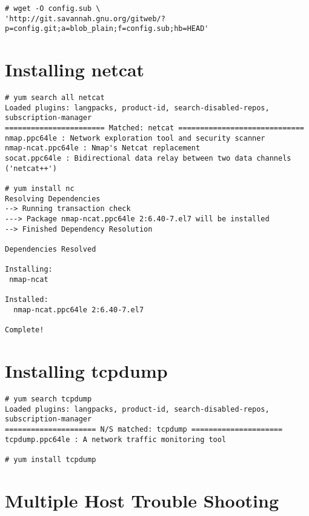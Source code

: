 \documentclass[letter]{article}
\begin{document}
{{\begin{appendices}
{\begin{lstlisting}
# wget -O config.sub \
'http://git.savannah.gnu.org/gitweb/?p=config.git;a=blob_plain;f=config.sub;hb=HEAD' 
\end{lstlisting}

\section{Installing netcat}
\label{appendix:nc}

\begin{lstlisting}
# yum search all netcat
Loaded plugins: langpacks, product-id, search-disabled-repos, subscription-manager
======================= Matched: netcat =============================
nmap.ppc64le : Network exploration tool and security scanner
nmap-ncat.ppc64le : Nmap's Netcat replacement
socat.ppc64le : Bidirectional data relay between two data channels ('netcat++')

# yum install nc
Resolving Dependencies
--> Running transaction check
---> Package nmap-ncat.ppc64le 2:6.40-7.el7 will be installed
--> Finished Dependency Resolution

Dependencies Resolved

Installing:
 nmap-ncat

Installed:
  nmap-ncat.ppc64le 2:6.40-7.el7                                                                                                                                                                                                             

Complete!

\end{lstlisting}


\section{Installing tcpdump}
\label{appendix:tcpdump}

\begin{lstlisting}
# yum search tcpdump
Loaded plugins: langpacks, product-id, search-disabled-repos, subscription-manager
===================== N/S matched: tcpdump =====================
tcpdump.ppc64le : A network traffic monitoring tool

# yum install tcpdump
\end{lstlisting}


}%

\section{Multiple Host Trouble Shooting}
\label{appendix:multihost}


\end{appendices}}}
\end{document}
